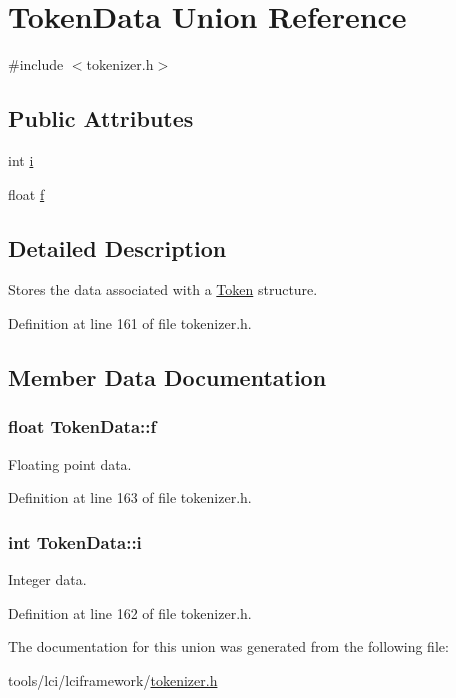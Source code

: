 \hypertarget{union_token_data}{\section{Token\-Data Union Reference}
\label{union_token_data}
}


{\ttfamily \#include $<$tokenizer.\-h$>$}

\subsection*{Public Attributes}
\begin{DoxyCompactItemize}
\item 
int \hyperlink{union_token_data_aa8084a7b7f73bcce7ccfa2e17b4d3c0f}{i}
\item 
float \hyperlink{union_token_data_affb76b1c0ea30bca741d3148601fee73}{f}
\end{DoxyCompactItemize}


\subsection{Detailed Description}
Stores the data associated with a \hyperlink{struct_token}{Token} structure. 

Definition at line 161 of file tokenizer.\-h.



\subsection{Member Data Documentation}
\hypertarget{union_token_data_affb76b1c0ea30bca741d3148601fee73}{
\subsubsection[{f}]{\setlength{\rightskip}{0pt plus 5cm}float {\bf Token\-Data\-::f}}}\label{union_token_data_affb76b1c0ea30bca741d3148601fee73}
Floating point data. 

Definition at line 163 of file tokenizer.\-h.

\hypertarget{union_token_data_aa8084a7b7f73bcce7ccfa2e17b4d3c0f}{
\subsubsection[{i}]{\setlength{\rightskip}{0pt plus 5cm}int {\bf Token\-Data\-::i}}}\label{union_token_data_aa8084a7b7f73bcce7ccfa2e17b4d3c0f}
Integer data. 

Definition at line 162 of file tokenizer.\-h.



The documentation for this union was generated from the following file\-:\begin{DoxyCompactItemize}
\item 
tools/lci/lciframework/\hyperlink{tokenizer_8h}{tokenizer.\-h}\end{DoxyCompactItemize}
